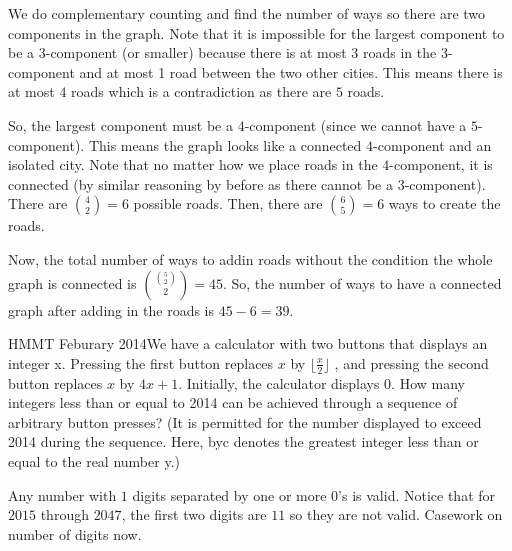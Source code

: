 \documentclass[11pt]{article}
\begin{document}

\begin{sol}
We do complementary counting and find the number of ways so there are two components in the graph. Note that it is impossible for the largest component to be a $3$-component (or smaller) because there is at most 3 roads in the $3$-component and at most 1 road between the two other cities. This means there is at most $4$ roads which is a contradiction as there are $5$ roads.

So, the largest component must be a $4$-component (since we cannot have a $5$-component). This means the graph looks like a connected $4$-component and an isolated city. Note that no matter how we place roads in the $4$-component, it is connected (by similar reasoning by before as there cannot be a 3-component). There are $\binom{4}{2}=6$ possible roads. Then, there are $\binom{6}{5}=6$ ways to create the roads. 

Now, the total number of ways to addin roads without the condition the whole graph is connected is $\binom{\binom{5}{2}}{2}=45$. So, the number of ways to have a connected graph after adding in the roads is $45-6=\boxed{39}$.
\end{sol}

 {HMMT Feburary 2014}{We have a calculator with two buttons that displays an integer x. Pressing the first button replaces
$x$ by $\lfloor \frac{x}{2} \rfloor$ , and pressing the second button replaces $x$ by $4x + 1$. Initially, the calculator displays 0.
How many integers less than or equal to 2014 can be achieved through a sequence of arbitrary button
presses? (It is permitted for the number displayed to exceed 2014 during the sequence. Here, byc
denotes the greatest integer less than or equal to the real number y.)}

\begin{sol}
Any number with $1$ digits separated by one or more $0$'s  is valid. Notice that for $2015$ through $2047$, the first two digits are $11$ so they are not valid. Casework on number of digits now.
\end{sol}

\end{document}
